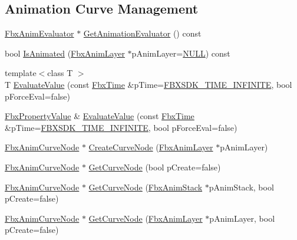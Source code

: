\subsection*{Animation Curve Management}
\begin{DoxyCompactItemize}
\item 
\hyperlink{class_fbx_anim_evaluator}{Fbx\+Anim\+Evaluator} $\ast$ \hyperlink{class_fbx_property_adcf2ea55a226994e1545b6179b33cbb2}{Get\+Animation\+Evaluator} () const
\item 
bool \hyperlink{class_fbx_property_a1ae3c41711a9684cb1b3e6cf454c9b12}{Is\+Animated} (\hyperlink{class_fbx_anim_layer}{Fbx\+Anim\+Layer} $\ast$p\+Anim\+Layer=\hyperlink{fbxarch_8h_a070d2ce7b6bb7e5c05602aa8c308d0c4}{N\+U\+LL}) const
\item 
{\footnotesize template$<$class T $>$ }\\T \hyperlink{class_fbx_property_a6256ee462711d9b236f345a4c7eb8a75}{Evaluate\+Value} (const \hyperlink{class_fbx_time}{Fbx\+Time} \&p\+Time=\hyperlink{fbxtime_8h_a1e6db3fe0f84f0b7daa775739f93526f}{F\+B\+X\+S\+D\+K\+\_\+\+T\+I\+M\+E\+\_\+\+I\+N\+F\+I\+N\+I\+TE}, bool p\+Force\+Eval=false)
\item 
\hyperlink{class_fbx_property_value}{Fbx\+Property\+Value} \& \hyperlink{class_fbx_property_ad581a049a2f336d6a3466fdd3c8c32c0}{Evaluate\+Value} (const \hyperlink{class_fbx_time}{Fbx\+Time} \&p\+Time=\hyperlink{fbxtime_8h_a1e6db3fe0f84f0b7daa775739f93526f}{F\+B\+X\+S\+D\+K\+\_\+\+T\+I\+M\+E\+\_\+\+I\+N\+F\+I\+N\+I\+TE}, bool p\+Force\+Eval=false)
\item 
\hyperlink{class_fbx_anim_curve_node}{Fbx\+Anim\+Curve\+Node} $\ast$ \hyperlink{class_fbx_property_a990b9a78c7af13adf76143b7e23f7c9b}{Create\+Curve\+Node} (\hyperlink{class_fbx_anim_layer}{Fbx\+Anim\+Layer} $\ast$p\+Anim\+Layer)
\item 
\hyperlink{class_fbx_anim_curve_node}{Fbx\+Anim\+Curve\+Node} $\ast$ \hyperlink{class_fbx_property_a75e8145e21782dd1cc405b09c0981dd9}{Get\+Curve\+Node} (bool p\+Create=false)
\item 
\hyperlink{class_fbx_anim_curve_node}{Fbx\+Anim\+Curve\+Node} $\ast$ \hyperlink{class_fbx_property_a7cbdcc1cccba29824790d0621911831d}{Get\+Curve\+Node} (\hyperlink{class_fbx_anim_stack}{Fbx\+Anim\+Stack} $\ast$p\+Anim\+Stack, bool p\+Create=false)
\item 
\hyperlink{class_fbx_anim_curve_node}{Fbx\+Anim\+Curve\+Node} $\ast$ \hyperlink{class_fbx_property_a26057248b360da2653fa9020d88258ac}{Get\+Curve\+Node} (\hyperlink{class_fbx_anim_layer}{Fbx\+Anim\+Layer} $\ast$p\+Anim\+Layer, bool p\+Create=false)

\end{DoxyCompactItemize}

